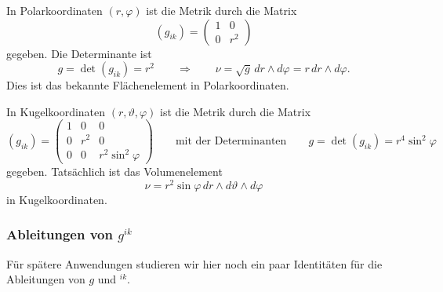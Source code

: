 \begin{beispiel}
In Polarkoordinaten $(r,\varphi)$ ist die Metrik durch die
%
Matrix
\[
(g_{ik})
=
\begin{pmatrix}
1 & 0 \\
0 & r^2
\end{pmatrix}
\]
gegeben.
Die Determinante ist
\[
g
=
\det(g_{ik})
=
r^2
\qquad
\Rightarrow
\qquad
\nu
=
\sqrt{g}\, dr\wedge d\varphi
=
r\,dr\wedge d\varphi.
\]
Dies ist das bekannte Flächenelement in Polarkoordinaten.
%
\end{beispiel}

\begin{beispiel}
In Kugelkoordinaten $(r,\vartheta,\varphi)$ ist die Metrik durch die
%
Matrix
\[
(g_{ik})
=
\begin{pmatrix}
1 &  0  & 0 \\
0 & r^2 & 0 \\
0 &  0  & r^2 \sin^2\varphi
\end{pmatrix}
\qquad
\text{mit der Determinanten}
\qquad
g = \det(g_{ik}) = r^4\sin^2\varphi
\]
gegeben.
Tatsächlich ist das Volumenelement 
\[
\nu 
=
r^2 \sin\varphi\,dr\wedge d\vartheta\wedge d\varphi
\]
in Kugelkoordinaten.
%
\end{beispiel}

%
%
\subsubsection{Ableitungen von $g^{ik}$}
Für spätere Anwendungen studieren wir hier noch ein paar Identitäten
für die Ableitungen von $g$ und $^{ik}$.


